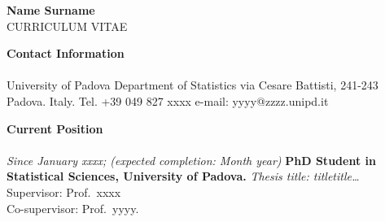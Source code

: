\documentclass[10pt]{amsart}
\begin{document}
	\thispagestyle{empty}
	
	\begin{center}
		{\LARGE {\bf Name Surname}} \\[.5pc]
		CURRICULUM VITAE
	\end{center}
	
	\bigskip 
	
	
	{\large {\bf Contact Information}} \\[-.08cm] 
	\underline{\hspace{6in}} \\[.2cm] 
	University of Padova\newline
	Department of Statistics\newline
	via Cesare Battisti, 241-243 Padova. Italy. \newline
	\newline
	Tel. +39 049 827 xxxx\newline
	e-mail: yyyy@zzzz.unipd.it
	\newline\newline
	
	{\large {\bf Current Position}} \\[-.08cm] 
	\underline{\hspace{6in}} \\[.2cm] 
	{\it Since January xxxx; (expected completion: Month year)}\newline
	{\bf PhD Student in Statistical Sciences,  University of Padova. 
	} 
	\newline 
	{\it Thesis title: titletitle\ldots }\\
	Supervisor: Prof.\ xxxx\\
	Co-supervisor: Prof.\ yyyy. 
	\newline 
	
\end{document}
